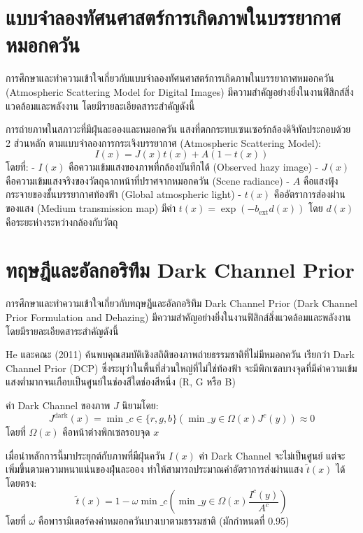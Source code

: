
\section{แบบจำลองทัศนศาสตร์การเกิดภาพในบรรยากาศหมอกควัน}

การศึกษาและทำความเข้าใจเกี่ยวกับแบบจำลองทัศนศาสตร์การเกิดภาพในบรรยากาศหมอกควัน (Atmospheric Scattering Model for Digital Images) มีความสำคัญอย่างยิ่งในงานฟิสิกส์สิ่งแวดล้อมและพลังงาน โดยมีรายละเอียดสาระสำคัญดังนี้

การถ่ายภาพในสภาวะที่มีฝุ่นละอองและหมอกควัน แสงที่ตกกระทบเซนเซอร์กล้องดิจิทัลประกอบด้วย 2 ส่วนหลัก ตามแบบจำลองการกระเจิงบรรยากาศ (Atmospheric Scattering Model):
\[ I(x) = J(x)t(x) + A(1 - t(x)) \]
โดยที่:
- $I(x)$ คือความเข้มแสงของภาพที่กล้องบันทึกได้ (Observed hazy image)
- $J(x)$ คือความเข้มแสงจริงของวัตถุฉากหน้าที่ปราศจากหมอกควัน (Scene radiance)
- $A$ คือแสงฟุ้งกระจายของชั้นบรรยากาศท้องฟ้า (Global atmospheric light)
- $t(x)$ คืออัตราการส่องผ่านของแสง (Medium transmission map) มีค่า $t(x) = \exp(-b_{\text{ext}} d(x))$ โดย $d(x)$ คือระยะห่างระหว่างกล้องกับวัตถุ

\section{ทฤษฎีและอัลกอริทึม Dark Channel Prior}

การศึกษาและทำความเข้าใจเกี่ยวกับทฤษฎีและอัลกอริทึม Dark Channel Prior (Dark Channel Prior Formulation and Dehazing) มีความสำคัญอย่างยิ่งในงานฟิสิกส์สิ่งแวดล้อมและพลังงาน โดยมีรายละเอียดสาระสำคัญดังนี้

He และคณะ (2011) ค้นพบคุณสมบัติเชิงสถิติของภาพถ่ายธรรมชาติที่ไม่มีหมอกควัน เรียกว่า Dark Channel Prior (DCP) ซึ่งระบุว่าในพื้นที่ส่วนใหญ่ที่ไม่ใช่ท้องฟ้า จะมีพิกเซลบางจุดที่มีค่าความเข้มแสงต่ำมากจนเกือบเป็นศูนย์ในช่องสีใดช่องสีหนึ่ง (R, G หรือ B)

ค่า Dark Channel ของภาพ $J$ นิยามโดย:
\[ J^{\text{dark}}(x) = \min\_{c \in \{r,g,b\}} \left( \min\_{y \in \Omega(x)} J^c(y) \right) \approx 0 \]
โดยที่ $\Omega(x)$ คือหน้าต่างพิกเซลรอบจุด $x$

เมื่อนำหลักการนี้มาประยุกต์กับภาพที่มีฝุ่นควัน $I(x)$ ค่า Dark Channel จะไม่เป็นศูนย์ แต่จะเพิ่มขึ้นตามความหนาแน่นของฝุ่นละออง ทำให้สามารถประมาณค่าอัตราการส่งผ่านแสง $\tilde{t}(x)$ ได้โดยตรง:
\[ \tilde{t}(x) = 1 - \omega \min\_{c} \left( \min\_{y \in \Omega(x)} \frac{I^c(y)}{A^c} \right) \]
โดยที่ $\omega$ คือพารามิเตอร์คงค่าหมอกควันบางเบาตามธรรมชาติ (มักกำหนดที่ 0.95)

